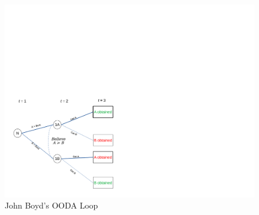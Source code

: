 \documentclass[
11pt,
titlepage,
reqno,
]{article}%
\theoremstyle{definition}
\begin{document}
\begin{figure}[h!]
	\centering
	\includegraphics*[page=11,trim = 0in 2in 0in 0in,scale=.65]{Awareness_Diagrams_All}
	\caption{John Boyd's OODA Loop\label{Diag: p-11}}%
\end{figure}





\end{document}
